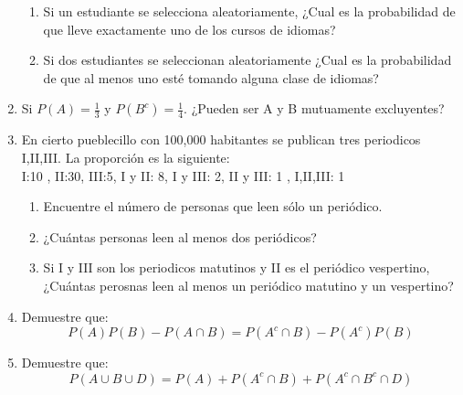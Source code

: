 \documentclass[12pt,a4paper]{report}
\begin{document}
\begin{enumerate}
{\begin{enumerate}[label=\alph*) ]
{   }

   \item {
   Si un estudiante se selecciona aleatoriamente, ¿Cual es la probabilidad de que lleve exactamente uno de los cursos de idiomas?\\

   }

   \item {
  Si dos estudiantes se seleccionan aleatoriamente ¿Cual es la probabilidad de que al menos uno esté tomando alguna clase de idiomas?\\

   }


	\end{enumerate}

	}

   \item {
  	Si $P(A) = \frac{1}{3}$ y $P(B^c)=\frac{1}{4}$. ¿Pueden ser A y B mutuamente excluyentes?
	}

   \item {
    En cierto pueblecillo con 100,000 habitantes se publican tres periodicos I,II,III. La proporción es la siguiente:\\
I:10 , II:30, III:5, I y II: 8, I y III: 2, II y III: 1 , I,II,III: 1
	\begin{enumerate}[label=\alph*) ]
   \item {
   Encuentre el número de personas que leen sólo un periódico.\\

   }

   \item {
   ¿Cuántas personas leen al menos dos periódicos?\\

   }

   \item {
  Si I y III son los periodicos matutinos y II es el periódico vespertino, ¿Cuántas perosnas leen al menos un periódico matutino y un vespertino?\\

   }

	\end{enumerate}

    }

   \item {
    Demuestre que:\\
	$$P(A)P(B)-P(A \cap B)=P(A^c \cap B )- P(A^c)P(B)$$
	}

   \item {
    Demuestre que:\\
	$$P(A \cup B \cup D) = P(A)+P(A^c \cap B) +P(A^c \cap B^c \cap D)$$
	}


\end{enumerate}
\end{document}
